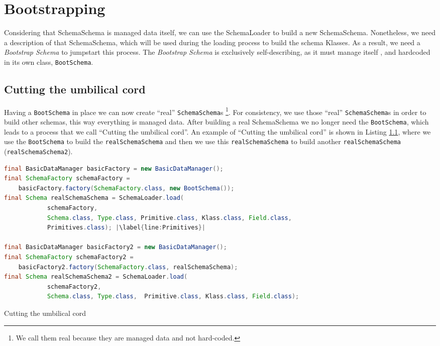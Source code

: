 \section{Bootstrapping}\label{sec:Bootstrapping}
Considering that SchemaSchema is managed data itself, we can use the SchemaLoader to build a new SchemaSchema.
Nonetheless, we need a description of that SchemaSchema, which will be used during the loading process to build the schema Klasses.
As a result, we need a \textit{Bootstrap Schema} to jumpstart this process.
The \textit{Bootstrap Schema} is exclusively self-describing, as it must manage itself \cite{loh2012managed}, and hardcoded in its own class, \texttt{BootSchema}.

\subsection{Cutting the umbilical cord}\label{subsec:Cutting the umbilical cord}
Having a \texttt{BootSchema} in place we can now create ``real'' \texttt{SchemaSchema}s \footnote{
	We call them real because they are managed data and not hard-coded.}.
For consistency, we use those ``real'' \texttt{SchemaSchema}s in order to build other schemas, this way everything is managed data.
After building a real SchemaSchema we no longer need the \texttt{BootSchema}, which leads to a process that we call ``Cutting the umbilical cord''.
An example of ``Cutting the umbilical cord'' is shown in Listing \ref{subsec:Cutting the umbilical cord}, where we use the \texttt{BootSchema} to build the \texttt{realSchemaSchema} and then we use this \texttt{realSchemaSchema} to build another \texttt{realSchemaSchema} (\texttt{realSchemaSchema2}).

\begin{sourcecode} [H]
	\begin{lstlisting}[language=Java, escapechar=|]
final BasicDataManager basicFactory = new BasicDataManager();
final SchemaFactory schemaFactory = 
	basicFactory.factory(SchemaFactory.class, new BootSchema());
final Schema realSchemaSchema = SchemaLoader.load(
        	schemaFactory,
         	Schema.class, Type.class, Primitive.class, Klass.class, Field.class,
        	Primitives.class); |\label{line:Primitives}|

final BasicDataManager basicFactory2 = new BasicDataManager();
final SchemaFactory schemaFactory2 = 
	basicFactory2.factory(SchemaFactory.class, realSchemaSchema);
final Schema realSchemaSchema2 = SchemaLoader.load(
        	schemaFactory2, 
        	Schema.class, Type.class,  Primitive.class, Klass.class, Field.class);
	\end{lstlisting}
	\caption{Cutting the umbilical cord}
	\label{lst:Cutting the umbilical cord}
\end{sourcecode}

